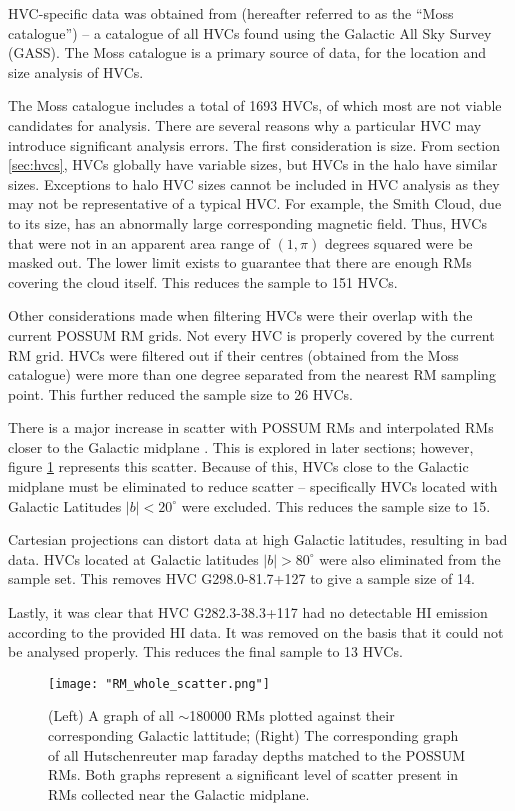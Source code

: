 HVC-specific data was obtained from \cite{ID3} (hereafter referred to as the “Moss catalogue”) – a catalogue of all HVCs found using the Galactic All Sky Survey (GASS). The Moss catalogue is a primary source of data, for the location and size analysis of HVCs.


The Moss catalogue includes a total of 1693 HVCs, of which most are not viable candidates for analysis. There are several reasons why a particular HVC may introduce significant analysis errors. The first consideration is size. From section \ref{sec:hvcs}, HVCs globally have variable sizes, but HVCs in the halo have similar sizes. Exceptions to halo HVC sizes cannot be included in HVC analysis as they may not be representative of a typical HVC. For example, the Smith Cloud, due to its size, has an abnormally large corresponding magnetic field. Thus, HVCs that were not in an apparent area range of $(1,\pi)$ degrees squared were be masked out. The lower limit exists to guarantee that there are enough RMs covering the cloud itself. This reduces the sample to 151 HVCs.


Other considerations made when filtering HVCs were their overlap with the current POSSUM RM grids. Not every HVC is properly covered by the current RM grid. HVCs were filtered out if their centres (obtained from the Moss catalogue) were more than one degree separated from the nearest RM sampling point. This further reduced the sample size to 26 HVCs.


There is a major increase in scatter with POSSUM RMs and interpolated RMs closer to the Galactic midplane \citep{ID21}. This is explored in later sections; however, figure \ref{fig:rm_scatter} represents this scatter. Because of this, HVCs close to the Galactic midplane must be eliminated to reduce scatter – specifically HVCs located with Galactic Latitudes $|b|<20^{\circ}$ were excluded. This reduces the sample size to 15.


Cartesian projections can distort data at high Galactic latitudes, resulting in bad data. HVCs located at Galactic latitudes $|b|>80^{\circ}$ were also eliminated from the sample set. This removes HVC G298.0-81.7+127 to give a sample size of 14.

Lastly, it was clear that HVC G282.3-38.3+117 had no detectable HI emission according to the provided HI data. It was removed on the basis that it could not be analysed properly. This reduces the final sample to 13 HVCs.

\begin{figure}
    \texttt{[image: "RM\_whole\_scatter.png"]}
    \centering
    \caption{(Left) A graph of all $\sim$180000 RMs plotted against their corresponding Galactic lattitude; (Right) The corresponding graph of all Hutschenreuter map faraday depths matched to the POSSUM RMs. Both graphs represent a significant level of scatter present in RMs collected near the Galactic midplane.}
    \label{fig:rm_scatter}
\end{figure}

